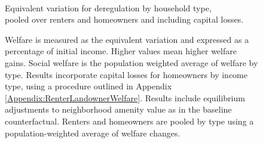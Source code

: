 \documentclass[12pt]{article}
\begin{document}
	
	\begin{figure}[htbp!]
		\begin{center}
			\caption{ \\ Equivalent variation for deregulation by household type, \\ pooled over renters and homeowners and including capital losses. }\label{figure:welfarePooled_ctfl}
		\end{center}
		\caption*{Welfare is measured as the equivalent variation and expressed as a percentage of initial income. Higher values mean higher welfare gains. Social welfare is the population weighted average of welfare by type. Results incorporate capital losses for homeowners by income type, using a procedure outlined in Appendix \ref{Appendix:RenterLandownerWelfare}. Results include equilibrium adjustments to neighborhood amenity value as in the baseline counterfactual. Renters and homeowners are pooled by type using a population-weighted average of welfare changes.}
	\end{figure}
	
	
	
\end{document}
